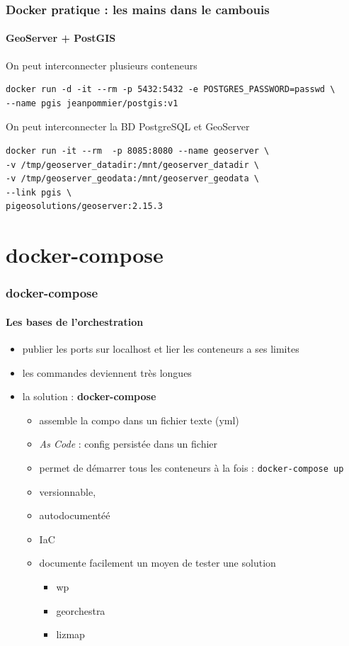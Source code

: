 \documentclass[11pt]{beamer}
\begin{document}
\begin{frame}[fragile]
\frametitle{Docker pratique : les mains dans le cambouis}
\framesubtitle{GeoServer + PostGIS}
On peut interconnecter plusieurs conteneurs

\begin{lstlisting}
docker run -d -it --rm -p 5432:5432 -e POSTGRES_PASSWORD=passwd \
--name pgis jeanpommier/postgis:v1
\end{lstlisting}

On peut interconnecter la BD PostgreSQL  et GeoServer
\begin{lstlisting}
docker run -it --rm  -p 8085:8080 --name geoserver \
-v /tmp/geoserver_datadir:/mnt/geoserver_datadir \
-v /tmp/geoserver_geodata:/mnt/geoserver_geodata \
--link pgis \
pigeosolutions/geoserver:2.15.3
\end{lstlisting}
\end{frame}

\section{docker-compose}

\begin{frame}[fragile]
\frametitle{docker-compose}
\framesubtitle{Les bases de l'orchestration}
\begin{itemize}
	\item publier les ports sur localhost et lier les conteneurs a ses limites
	\item les commandes deviennent très longues
	\item la solution : \textbf{docker-compose}
	\begin{itemize}
		\item assemble la compo dans un fichier texte (yml) 
		\item \textit{As Code} : config persistée dans un fichier
		\item permet de démarrer tous les conteneurs à la fois : \verb|docker-compose up|
		\item versionnable, 
		\item autodocumentéé
		\item IaC
		\item documente facilement un moyen de tester une solution
		\begin{itemize}
			\item wp
			\item georchestra
			\item lizmap
		\end{itemize}
	\end{itemize}
\end{itemize}
\end{frame}
\end{document}
